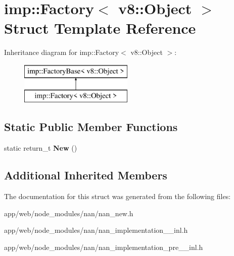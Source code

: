 \hypertarget{structimp_1_1_factory_3_01v8_1_1_object_01_4}{}\section{imp\+:\+:Factory$<$ v8\+:\+:Object $>$ Struct Template Reference}
\label{structimp_1_1_factory_3_01v8_1_1_object_01_4}
Inheritance diagram for imp\+:\+:Factory$<$ v8\+:\+:Object $>$\+:\begin{figure}[H]
\begin{center}
\leavevmode
\includegraphics[height=2.000000cm]{structimp_1_1_factory_3_01v8_1_1_object_01_4}
\end{center}
\end{figure}
\subsection*{Static Public Member Functions}
\begin{DoxyCompactItemize}
\item 
\mbox{\label{structimp_1_1_factory_3_01v8_1_1_object_01_4_a4226c57737c8ca141db9a82764c22636}} 
static return\+\_\+t {\bfseries New} ()
\end{DoxyCompactItemize}
\subsection*{Additional Inherited Members}


The documentation for this struct was generated from the following files\+:\begin{DoxyCompactItemize}
\item 
app/web/node\+\_\+modules/nan/nan\+\_\+new.\+h\item 
app/web/node\+\_\+modules/nan/nan\+\_\+implementation\+\_\+\_\+inl.\+h\item 
app/web/node\+\_\+modules/nan/nan\+\_\+implementation\+\_\+pre\+\_\+\_\+inl.\+h\end{DoxyCompactItemize}
